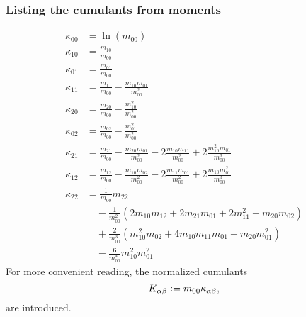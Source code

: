 \documentclass{article}
\begin{document}
\subsubsection{Listing the cumulants from moments}
\label{subs:Listing the cumulants from moments}
\begin{align}
  \kappa_{00} & = \ln(m_{00}) \\
  \kappa_{10} & = \frac{m_{10}}{m_{00}} \\
  \kappa_{01} & = \frac{m_{01}}{m_{00}} \\
  \kappa_{11} & = \frac{m_{11}}{m_{00}} - \frac{m_{10}m_{01}}{m_{00}^2} \\
  \kappa_{20} & = \frac{m_{20}}{m_{00}} - \frac{m_{10}^2}{m_{00}^2} \\
  \kappa_{02} & = \frac{m_{02}}{m_{00}} - \frac{m_{01}^2}{m_{00}^2} \\
  \kappa_{21} & = \frac{m_{21}}{m_{00}} - \frac{m_{20}m_{01}}{m_{00}^2}
       - 2\frac{m_{10}m_{11}}{m_{00}^2} + 2\frac{m_{10}^2 m_{01}}{m_{00}^3} \\
  \kappa_{12} & = \frac{m_{12}}{m_{00}} - \frac{m_{10}m_{02}}{m_{00}^2}
       - 2\frac{m_{11}m_{01}}{m_{00}^2} + 2\frac{m_{10} m_{01}^2}{m_{00}^3} \\
  \kappa_{22} & = \frac{1}{m_{00}} m_{22} \\
    &\quad
    - \frac{1}{m_{00}^2}
    \left(
       2 m_{10}m_{12}  + 2m_{21}m_{01} + 2 m_{11}^2 + m_{20}m_{02}
    \right) \\
    &\quad
    + \frac{2}{m_{00}^3}
      \left(
        m_{10}^2 m_{02} + 4 m_{10}m_{11}m_{01} + m_{20}m_{01}^2
      \right)\\
    &\quad
    - \frac{6}{m_{00}^4} m_{10}^2 m_{01}^2
\end{align}
For more convenient reading, the normalized cumulants
\begin{equation}
  \label{eq: definition normalized cumulants}
  K_{\alpha\beta} \mathrel{\mathop:}= m_{00}\kappa_{\alpha\beta},
\end{equation}
are introduced.
\end{document}
